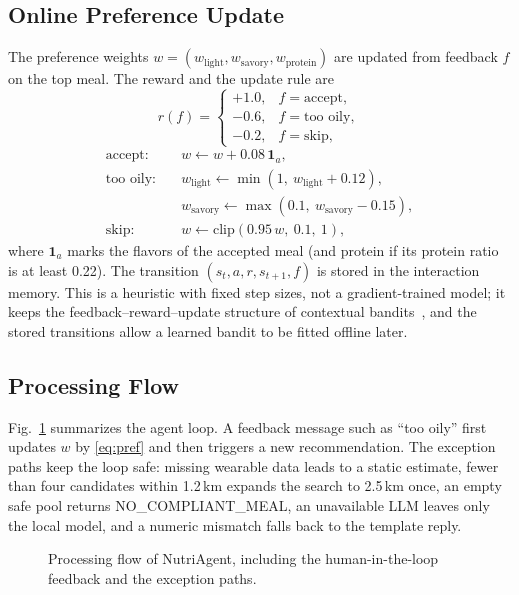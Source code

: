 \subsection{Online Preference Update}
The preference weights $w = (w_{\mathrm{light}}, w_{\mathrm{savory}},
w_{\mathrm{protein}})$ are updated from feedback $f$ on the top meal. The
reward and the update rule are
\begin{equation}
    r(f) =
    \begin{cases}
        +1.0, & f = \text{accept},\\
        -0.6, & f = \text{too oily},\\
        -0.2, & f = \text{skip},
    \end{cases}
    \label{eq:reward}
\end{equation}
\begin{align}
    \text{accept:}\quad   & w \gets w + 0.08\,\mathbf{1}_{a}, \nonumber\\
    \text{too oily:}\quad & w_{\mathrm{light}} \gets \min(1,\ w_{\mathrm{light}} + 0.12), \nonumber\\
                          & w_{\mathrm{savory}} \gets \max(0.1,\ w_{\mathrm{savory}} - 0.15), \nonumber\\
    \text{skip:}\quad     & w \gets \mathrm{clip}(0.95\,w,\ 0.1,\ 1), \label{eq:pref}
\end{align}
where $\mathbf{1}_{a}$ marks the flavors of the accepted meal (and protein if
its protein ratio is at least 0.22). The transition $(s_t, a, r, s_{t+1}, f)$
is stored in the interaction memory. This is a heuristic with fixed step sizes,
not a gradient-trained model; it keeps the feedback--reward--update structure
of contextual bandits~\cite{lei2017actorcritic}, and the stored transitions
allow a learned bandit to be fitted offline later.

\subsection{Processing Flow}
Fig.~\ref{fig:flowchart} summarizes the agent loop. A feedback message such as
``too oily'' first updates $w$ by \eqref{eq:pref} and then triggers a new
recommendation. The exception paths keep the loop safe: missing wearable data
leads to a static estimate, fewer than four candidates within 1.2\,km expands
the search to 2.5\,km once, an empty safe pool returns NO\_COMPLIANT\_MEAL, an
unavailable LLM leaves only the local model, and a numeric mismatch falls back
to the template reply.

\begin{figure}[t]
    \centering
    
    \caption{Processing flow of NutriAgent, including the human-in-the-loop
    feedback and the exception paths.}
    \label{fig:flowchart}
\end{figure}
